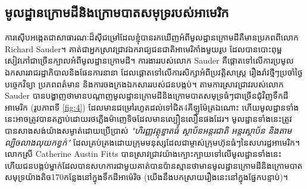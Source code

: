 \documentclass[10pt,twocolumn,letterpaper]{article}
\begin{document}
\subsection{មូលដ្ឋានក្រោមដីនិងក្រោមបាតសមុទ្ររបស់អាមេរិក}

	ការស៊ើបអង្កេតជាសាធារណៈដ៏សុីជម្រៅដែលខ្ញុំបានរកឃើញអំពីមូលដ្ឋានក្រោមដីគឺមានប្រភពពីលោក Richard Sauder។ គាត់ជាអ្នកស្រាវជ្រាវឯករាជ្យជនជាតិអាមេរិកាំងមួយរូប ដែលបានបោះពុម្ពសៀវភៅជាច្រើនក្បាលអំពីមូលដ្ឋានក្រោមដី\cite{22}។ ការងាររបស់លោក Sauder គឺផ្តោតទៅលើការប្រមូលឯកសាររាជរដ្ឋាភិបាលនិងផែនការនានា ដែលផ្តោតទៅលើការសិក្សាអំពីប្រវត្តិសាស្ត្រ រឿងរ៉ាវថ្មីៗប្រចាំថ្ងៃ បច្ចេកវិទ្យា ប្រភពពត៌មាន និងការចងក្រងឯកសាររបស់ជនបង្កប់។ តាមការស្រាវជ្រាវរបស់លោក Sauder បានបង្ហាញថាមានបណ្តាញមូលដ្ឋានក្រោមដីនិងក្រោមបាតសមុទ្រធំៗជាច្រើនជុំវិញទឹកដីអាមេរិក (រូបភាពទី \ref{fig:4}) ដែលមានជម្រៅរហូតដល់ទៅជិត4គីឡូម៉ែត្រឯណោះ ហើយមូលដ្ឋានទាំងនេះអាចត្រូវបានតភ្ជាប់ដោយរថភ្លើងម៉ាញេទិចដែលមានល្បឿនលឿនផងដែរ។ មូលដ្ឋានទាំងនេះ​ត្រូវបានសាងសង់យ៉ាងសម្ងាត់ដោយប្រើប្រាស់ \textit{"ហិរញ្ញវត្ថុខ្នាតធំ​ ស្ថាប័នអន្តរជាតិ អន្តរស្ថាប័ន និងតាមល្បិចលាងលុយកខ្វក់"} ដែលគ្រប់គ្រងដោយក្រុមមនុស្សដែលជាម្ចាស់ក្រុមហ៊ុនធំៗនៃសហរដ្ឋអាមេរិក\cite{22}។ លោកស្រី Catherine Austin Fitts បានស្រាវជ្រាវយ៉ាងក្បោះក្បាយទៅលើមូលដ្ឋានទាំងនេះ ហើយជនបង្កប់ម្នាក់ដែលបានសហការជាមួយគាត់បានប៉ានស្មានថាមានមូលដ្ឋានក្រោមដីនិងក្រោមបាតសមុទ្រយ៉ាងតិច170កន្លែងនៅក្នុងទឹកដីអាម៉េរិច (យើងនឹងបកស្រាយរឿងនេះនៅក្នុងផ្នែកបន្ទាប់)\cite{16,20}។
\end{document}
